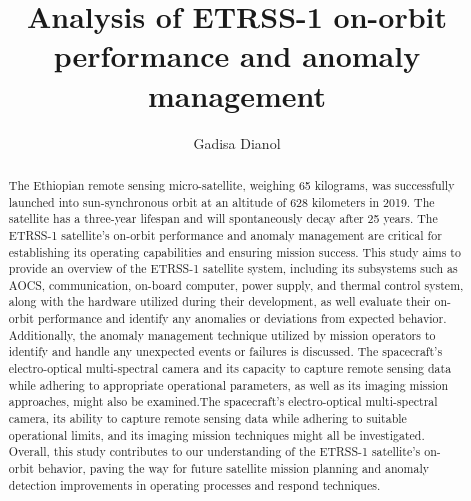 \documentclass[final,5p,times,twocolumn]{elsarticle}
\begin{document}
\begin{frontmatter}

\title{Analysis of ETRSS-1 on-orbit performance and anomaly management}

\author[1]{Gadisa Dianol}

\begin{abstract}
The Ethiopian remote sensing micro-satellite, weighing 65 kilograms, was successfully launched into sun-synchronous orbit at an altitude of 628 kilometers in 2019. The satellite has a three-year lifespan and will spontaneously decay after 25 years.  The ETRSS-1 satellite's on-orbit performance and anomaly management are critical for establishing its operating capabilities and ensuring mission success. This study aims to provide an overview of the ETRSS-1 satellite system, including its subsystems such as AOCS, communication, on-board computer, power supply, and thermal control system, along with the hardware utilized during their development, as well evaluate their on-orbit performance and identify any anomalies or deviations from expected behavior. Additionally, the anomaly management technique utilized by mission operators to identify and handle any unexpected events or failures is discussed. The spacecraft's electro-optical multi-spectral camera and its capacity to capture remote sensing data while adhering to appropriate operational parameters, as well as its imaging mission approaches, might also be examined.The spacecraft's electro-optical multi-spectral camera, its ability to capture remote sensing data while adhering to suitable operational limits, and its imaging mission techniques might all be investigated.  Overall, this study contributes to our understanding of the ETRSS-1 satellite's on-orbit behavior, paving the way for future satellite mission planning and anomaly detection improvements in operating processes and respond techniques.
\end{abstract}


\end{frontmatter}
\end{document}
